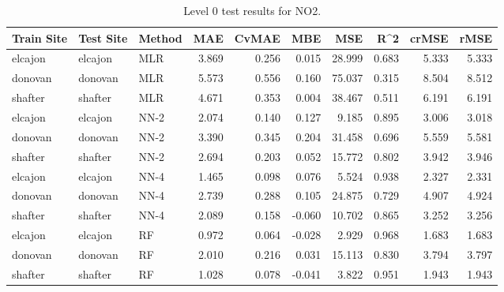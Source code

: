 \begin{table}[h]
\begin{tabular}{lllrrrrrrr}
\toprule
 Train Site & Test Site & Method &   MAE &  CvMAE &       MBE &     MSE &   R\textasciicircum2 &  crMSE &   rMSE \\
\midrule
elcajon & elcajon & MLR & 3.869 & 0.256 & 0.015 & 28.999 & 0.683 & 5.333 & 5.333\\
donovan & donovan & MLR & 5.573 & 0.556 & 0.160 & 75.037 & 0.315 & 8.504 & 8.512\\
shafter & shafter & MLR & 4.671 & 0.353 & 0.004 & 38.467 & 0.511 & 6.191 & 6.191\\
elcajon & elcajon & NN-2 & 2.074 & 0.140 & 0.127 & 9.185 & 0.895 & 3.006 & 3.018\\
donovan & donovan & NN-2 & 3.390 & 0.345 & 0.204 & 31.458 & 0.696 & 5.559 & 5.581\\
shafter & shafter & NN-2 & 2.694 & 0.203 & 0.052 & 15.772 & 0.802 & 3.942 & 3.946\\
elcajon & elcajon & NN-4 & 1.465 & 0.098 & 0.076 & 5.524 & 0.938 & 2.327 & 2.331\\
donovan & donovan & NN-4 & 2.739 & 0.288 & 0.105 & 24.875 & 0.729 & 4.907 & 4.924\\
shafter & shafter & NN-4 & 2.089 & 0.158 & -0.060 & 10.702 & 0.865 & 3.252 & 3.256\\
elcajon & elcajon & RF & 0.972 & 0.064 & -0.028 & 2.929 & 0.968 & 1.683 & 1.683\\
donovan & donovan & RF & 2.010 & 0.216 & 0.031 & 15.113 & 0.830 & 3.794 & 3.797\\
shafter & shafter & RF & 1.028 & 0.078 & -0.041 & 3.822 & 0.951 & 1.943 & 1.943\\
\bottomrule
\end{tabular}
\caption{Level 0 test results for NO2.}
\end{table}

